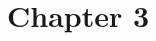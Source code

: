 \setlength{\headheight}{1.2cm}
\renewcommand{\publ}{\flushleft\footnotesize{Based on:\\[0.1cm]
		\textit{``Title''} \\[0.1cm]
}}

\chapter{Chapter 3}\label{chap:3}


